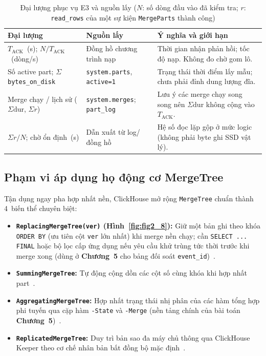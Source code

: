 \documentclass[13pt,a4paper]{report}
\begin{document}
\begin{table}[!htb]
\centering
\footnotesize
\renewcommand{\arraystretch}{1.14}
\caption[Đại lượng đo lường phục vụ E3 và nguồn lấy]{Đại lượng phục vụ E3 và nguồn lấy ($N$: số dòng đầu vào đã kiểm tra; $r$: \texttt{read\_rows} của một sự kiện \texttt{MergeParts} thành công)}
\label{tab:e3_metrics}
\begin{tabularx}{\textwidth}{>{\raggedright\arraybackslash}p{4.1cm} >{\raggedright\arraybackslash}p{3.9cm} >{\raggedright\arraybackslash}X}
\toprule
\textbf{Đại lượng} & \textbf{Nguồn lấy} & \textbf{Ý nghĩa và giới hạn} \\
\midrule
$T_{\text{ACK}}$~(s); $N/T_{\text{ACK}}$~(dòng/s) & Đồng hồ chương trình nạp & Thời gian nhận phản hồi; tốc độ nạp. Không đo chờ gom lô. \\
\addlinespace[3pt]
Số active part; $\Sigma$\,\texttt{bytes\_\allowbreak{}on\_\allowbreak{}disk} & \texttt{system.\allowbreak{}parts}, \texttt{active=1} & Trạng thái thời điểm lấy mẫu; chưa phải đỉnh dung lượng đĩa. \\
\addlinespace[3pt]
Merge chạy / lịch sử ($\Sigma\text{dur}$, $\Sigma r$) & \texttt{system.\allowbreak{}merges}; \texttt{part\_\allowbreak{}log} & Lưu ý các merge chạy song song nên $\Sigma\text{dur}$ không cộng vào $T_{\text{ACK}}$. \\
\addlinespace[3pt]
$\Sigma r / N$; chờ ổn định~(s) & Dẫn xuất từ log/đồng hồ & Hệ số đọc lặp gộp ở mức logic (không phải byte ghi SSD vật lý). \\
\bottomrule
\end{tabularx}
\end{table}

\FloatBarrier
\subsection{Phạm vi áp dụng họ động cơ MergeTree}
Tận dụng ngay pha hợp nhất nền, ClickHouse mở rộng \texttt{MergeTree} chuẩn thành 4~biến thể chuyên biệt:
\begin{itemize}
    \setlength{\itemsep}{3pt}\setlength{\parskip}{0pt}
    \item \textbf{\texttt{ReplacingMergeTree(ver)} (Hình~\ref{fig:fig2_8}):} Giữ một bản ghi theo khóa \texttt{ORDER BY} (ưu tiên cột \texttt{ver} lớn nhất) khi merge nền chạy; cần \texttt{SELECT ... FINAL} hoặc bộ lọc cấp ứng dụng nếu yêu cầu khử trùng tức thời trước khi merge xong (dùng ở \textbf{Chương~5} cho bảng đối soát \texttt{event\_\allowbreak{}id})~\cite{V1}.
    \item \textbf{\texttt{SummingMergeTree}:} Tự động cộng dồn các cột số cùng khóa khi hợp nhất part~\cite{V2}.
    \item \textbf{\texttt{AggregatingMergeTree}:} Hợp nhất trạng thái nhị phân của các hàm tổng hợp phi tuyến qua cặp hàm \texttt{-State} và \texttt{-Merge} (nền tảng chính của bài toán \textbf{Chương~5})~\cite{V3}.
    \item \textbf{\texttt{ReplicatedMergeTree}:} Duy trì bản sao đa máy chủ thông qua ClickHouse Keeper theo cơ chế nhân bản bất đồng bộ mặc định~\cite{V4}.
\end{itemize}
\end{document}
